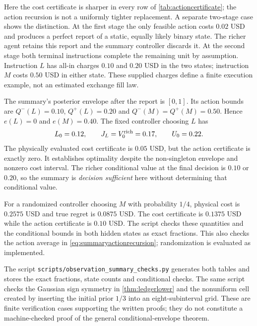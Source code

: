 Here the cost certificate is sharper in every row of
\cref{tab:actioncertificate}; the action recursion is not a uniformly
tighter replacement. A separate two-stage case shows the distinction.
At the first stage the only feasible action costs $0.02$ USD and produces
a perfect report of a static, equally likely binary state. The richer agent
retains this report and the summary controller discards it. At the second
stage both terminal instructions complete the remaining unit by assumption.
Instruction $L$ has all-in charges $0.10$ and $0.20$ USD in the two states;
instruction $M$ costs $0.50$ USD in either state. These supplied charges
define a finite execution example, not an estimated exchange fill law.

The summary's posterior envelope after the report is $[0,1]$. Its action
bounds are $Q^-(L)=0.10$, $Q^+(L)=0.20$ and
$Q^-(M)=Q^+(M)=0.50$. Hence $e(L)=0$ and $e(M)=0.40$.
The fixed controller choosing $L$ has
\[
 L_0=0.12,\qquad J_L=V_0^{\rm rich}=0.17,\qquad U_0=0.22.
\]
The physically evaluated cost certificate is $0.05$ USD, but the action
certificate is exactly zero. It establishes optimality despite the
non-singleton envelope and nonzero cost interval. The richer conditional
value at the final decision is $0.10$ or $0.20$, so the summary is
\emph{decision sufficient} here without determining that conditional value.

For a randomized controller choosing $M$ with probability $1/4$, physical
cost is $0.2575$ USD and true regret is $0.0875$ USD. The cost certificate
is $0.1375$ USD while the action certificate is $0.10$ USD. The script
checks these quantities and the conditional bounds in both hidden states
as exact fractions. This also checks the action average in
\eqref{eq:summaryactionrecursion}; randomization is evaluated as implemented.

The script \texttt{scripts/observation\_summary\_checks.py} generates both
tables and stores the exact fractions, state counts and conditional checks.
The same script checks the Gaussian sign symmetry in
\cref{thm:ledgerlower} and the nonuniform cell created by inserting the
initial prior $1/3$ into an eight-subinterval grid. These are finite
verification cases supporting the written proofs; they do not constitute a
machine-checked proof of the general conditional-envelope theorem.
